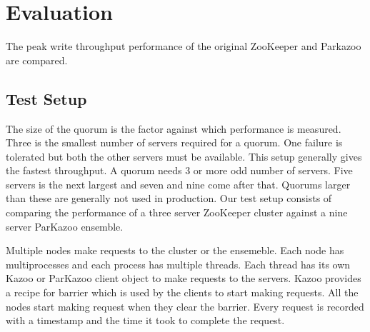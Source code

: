 \chapter{Evaluation}

The peak write throughput performance of the original ZooKeeper and Parkazoo are compared.

\section{Test Setup}
The size of the quorum is the factor against which performance is measured. Three is the smallest number of servers required for a quorum. One failure is tolerated but both the other servers must be available. This setup generally gives the fastest throughput. A quorum needs 3 or more odd number of servers. Five servers is the next largest and seven and nine come after that. Quorums larger than these are generally not used in production. Our test setup consists of comparing the performance of a three server ZooKeeper cluster against a nine server ParKazoo ensemble.

Multiple nodes make requests to the cluster or the ensemeble. Each node has multiprocesses and each process has multiple threads. Each thread has its own Kazoo or ParKazoo client object to make requests to the servers.
Kazoo provides a recipe for barrier which is used by the clients to start making requests. All the nodes start making request when they clear the barrier. Every request is recorded with a timestamp and the time it took to complete the request.
